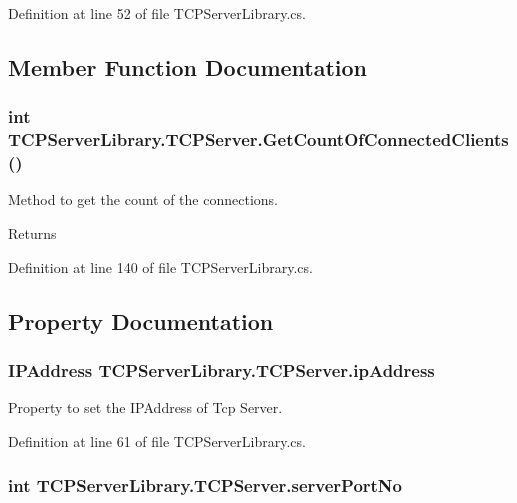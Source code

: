 Definition at line 52 of file TCPServerLibrary.cs.

\subsection{Member Function Documentation}
\hypertarget{class_t_c_p_server_library_1_1_t_c_p_server_aa826da2fbc53ac9b87d5ea410fca7f4d}{
\subsubsection[{GetCountOfConnectedClients}]{\setlength{\rightskip}{0pt plus 5cm}int TCPServerLibrary.TCPServer.GetCountOfConnectedClients ()}}
\label{class_t_c_p_server_library_1_1_t_c_p_server_aa826da2fbc53ac9b87d5ea410fca7f4d}


Method to get the count of the connections. \begin{DoxyReturn}{Returns}

\end{DoxyReturn}


Definition at line 140 of file TCPServerLibrary.cs.

\subsection{Property Documentation}
\hypertarget{class_t_c_p_server_library_1_1_t_c_p_server_a467ff186f80228c8caf623ebbf295f96}{
\subsubsection[{ipAddress}]{\setlength{\rightskip}{0pt plus 5cm}IPAddress TCPServerLibrary.TCPServer.ipAddress}}
\label{class_t_c_p_server_library_1_1_t_c_p_server_a467ff186f80228c8caf623ebbf295f96}


Property to set the IPAddress of Tcp Server. 

Definition at line 61 of file TCPServerLibrary.cs.\hypertarget{class_t_c_p_server_library_1_1_t_c_p_server_a505fbf9bb8faf9bcfb696a219c356a65}{
\subsubsection[{serverPortNo}]{\setlength{\rightskip}{0pt plus 5cm}int TCPServerLibrary.TCPServer.serverPortNo}}
\label{class_t_c_p_server_library_1_1_t_c_p_server_a505fbf9bb8faf9bcfb696a219c356a65}


